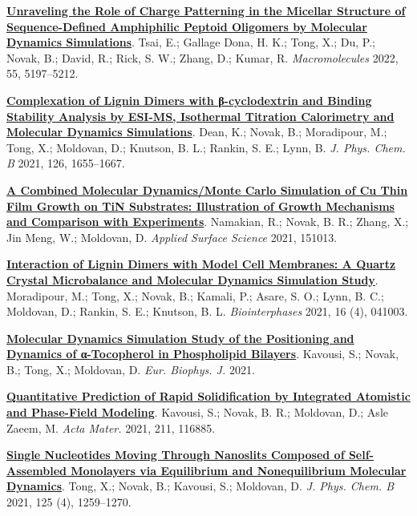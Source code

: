 
\begin{cventries}
  \cventry
    {} %
    {} %
    {} %
    {} %
    {
      \begin{cvitems} %
        \item{\href{https://doi.org/10.1021/acs.macromol.2c00141}{\textbf{Unraveling the Role of Charge Patterning in the Micellar Structure of Sequence-Defined Amphiphilic Peptoid Oligomers by Molecular Dynamics Simulations}}. Tsai, E.; Gallage Dona, H. K.; Tong, X.; Du, P.; Novak, B.; David, R.; Rick, S. W.; Zhang, D.; Kumar, R. \textit{Macromolecules} 2022, 55, 5197–5212.}
        \item{\href{https://doi.org/10.1021/acs.jpcb.1c09190}{\textbf{Complexation of Lignin Dimers with β-cyclodextrin and Binding Stability Analysis by ESI-MS, Isothermal Titration Calorimetry and Molecular Dynamics Simulations}}. Dean, K.; Novak, B.; Moradipour, M.; Tong, X.; Moldovan, D.; Knutson, B. L.; Rankin, S. E.; Lynn, B. \textit{J. Phys. Chem. B} 2021, 126, 1655–1667.}
        \item{\href{https://authors.elsevier.com/c/1dlt0cXa~yxmX}{\textbf{A Combined Molecular Dynamics/Monte Carlo Simulation of Cu Thin Film Growth on TiN Substrates: Illustration of Growth Mechanisms and Comparison with Experiments}}. Namakian, R.; Novak, B. R.; Zhang, X.; Jin Meng, W.; Moldovan, D. \textit{Applied Surface Science} 2021, 151013.}
        \item{\href{https://doi.org/10.1116/6.0001029}{\textbf{Interaction of Lignin Dimers with Model Cell Membranes: A Quartz Crystal Microbalance and Molecular Dynamics Simulation Study}}. Moradipour, M.; Tong, X.; Novak, B.; Kamali, P.; Asare, S. O.; Lynn, B. C.; Moldovan, D.; Rankin, S. E.; Knutson, B. L. \textit{Biointerphases} 2021, 16 (4), 041003.}
        \item {\href{https://rdcu.be/clAtY}{\textbf{Molecular Dynamics Simulation Study of the Positioning and Dynamics of α-Tocopherol in Phospholipid Bilayers}}. Kavousi, S.; Novak, B.; Tong, X.; Moldovan, D. \textit{Eur. Biophys. J.} 2021.}
        \item{\href{https://doi.org/10.1016/j.actamat.2021.116885}{\textbf{Quantitative Prediction of Rapid Solidification by Integrated Atomistic and Phase-Field Modeling}}. Kavousi, S.; Novak, B. R.; Moldovan, D.; Asle Zaeem, M. \textit{Acta Mater.} 2021, 211, 116885.}
        \item {\href{https://doi.org/10.1021/acs.jpcb.0c07797}{\textbf{Single Nucleotides Moving Through Nanoslits Composed of Self-Assembled Monolayers via Equilibrium and Nonequilibrium Molecular Dynamics}}. Tong, X.; Novak, B.; Kavousi, S.; Moldovan, D. \textit{J. Phys. Chem. B} 2021, 125 (4), 1259–1270.}

\end{cvitems}}
\end{cventries}
